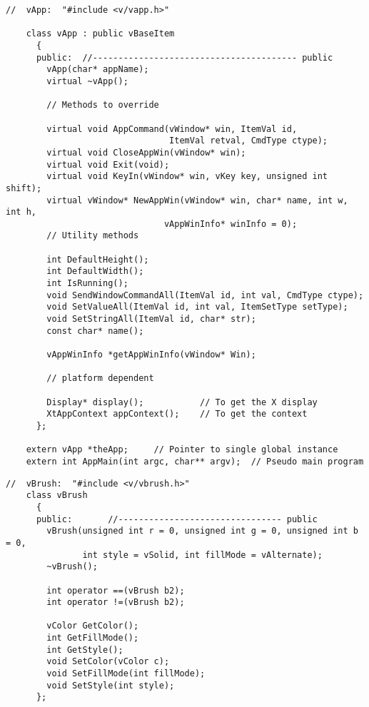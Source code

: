 \footnotesize
\begin{verbatim}
//  vApp:  "#include <v/vapp.h>"

    class vApp : public vBaseItem
      {
      public:  //---------------------------------------- public
        vApp(char* appName);
        virtual ~vApp();

        // Methods to override

        virtual void AppCommand(vWindow* win, ItemVal id,
                                ItemVal retval, CmdType ctype);
        virtual void CloseAppWin(vWindow* win);
        virtual void Exit(void);
        virtual void KeyIn(vWindow* win, vKey key, unsigned int shift);
        virtual vWindow* NewAppWin(vWindow* win, char* name, int w, int h, 
                               vAppWinInfo* winInfo = 0);
        // Utility methods

        int DefaultHeight();
        int DefaultWidth();
        int IsRunning();
        void SendWindowCommandAll(ItemVal id, int val, CmdType ctype);
        void SetValueAll(ItemVal id, int val, ItemSetType setType);
        void SetStringAll(ItemVal id, char* str);
        const char* name();

        vAppWinInfo *getAppWinInfo(vWindow* Win);

        // platform dependent

        Display* display();           // To get the X display
        XtAppContext appContext();    // To get the context
      };

    extern vApp *theApp;     // Pointer to single global instance
    extern int AppMain(int argc, char** argv);  // Pseudo main program

\end{verbatim}
\normalfont\normalsize


\footnotesize
\begin{verbatim}
//  vBrush:  "#include <v/vbrush.h>"
    class vBrush
      {
      public:       //-------------------------------- public
        vBrush(unsigned int r = 0, unsigned int g = 0, unsigned int b = 0,
               int style = vSolid, int fillMode = vAlternate);
        ~vBrush();

        int operator ==(vBrush b2);
        int operator !=(vBrush b2);

        vColor GetColor();
        int GetFillMode();
        int GetStyle();
        void SetColor(vColor c);
        void SetFillMode(int fillMode);
        void SetStyle(int style);
      };
\end{verbatim}
\normalfont\normalsize

